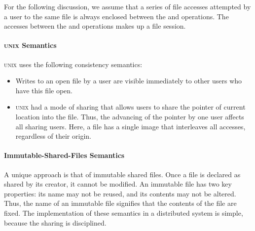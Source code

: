 For the following discussion, we assume that a series of file accesses attempted by a user to the same file is always enclosed between the  and  operations.
The accesses between the  and  operations makes up a file session.

\paragraph{\textsc{unix} Semantics}\label{par:UNIX_Consistency_Semantics}
\textsc{unix} uses the following consistency semantics:
\begin{itemize}[noitemsep]
\item Writes to an open file by a user are visible immediately to other users who have this file open.
\item \textsc{unix} had a mode of sharing that allows users to share the pointer of current location into the file.
  Thus, the advancing of the pointer by one user affects all sharing users.
  Here, a file has a single image that interleaves all accesses, regardless of their origin.
\end{itemize}

\paragraph{Immutable-Shared-Files Semantics}\label{par:Immutable_Shared_Files_Consistency_Semantics}
A unique approach is that of immutable shared files. Once
a file is declared as shared by its creator, it cannot be modified.
An immutable file has two key properties: its name may not be reused, and its contents may not be altered.
Thus, the name of an immutable file signifies that the contents of the file are fixed.
The implementation of these semantics in a distributed system is simple, because the sharing is disciplined.


